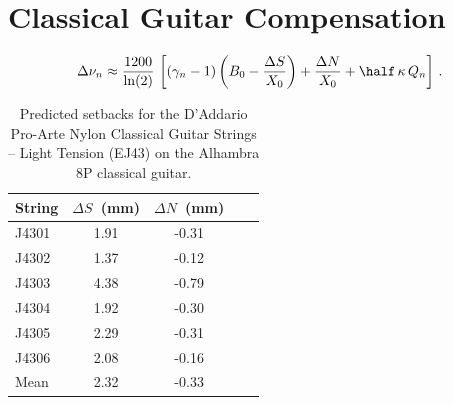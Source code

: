 %
%
%

 \section{Classical Guitar Compensation\label{sct:comp}}

 \begin{equation}\label{eqn:error_comp}
\Delta \nu_n \approx \frac{1200}{\ln(2)}\, \left[ \left(\gamma_n - 1\right) \left(B_0 - \frac{\Delta S}{X_0}\right) + \frac{\Delta N}{X_0} + \half\, \kappa\, Q_n \right]\, .
 \end{equation}



\begin{table}%
  \centering
  \caption{\label{tbl:ej43_setbacks} Predicted setbacks for the D'Addario Pro-Arte Nylon Classical Guitar Strings -- Light Tension (EJ43) on the Alhambra 8P classical guitar.}
    \begin{tabular}{lcccc}
    \hline \hline
    String  & $\Delta S$~(mm) & $\Delta N$~(mm) \\
    \hline
    J4301 & 1.91 & -0.31 \\
    J4302 & 1.37 & -0.12 \\
    J4303 & 4.38 & -0.79 \\
    J4304 & 1.92 & -0.30 \\
    J4305 & 2.29 & -0.31 \\
    J4306 & 2.08 & -0.16 \\
    \hline \hline
    Mean & 2.32 & -0.33 \\
    \hline
    \end{tabular}%
  \label{tab:addlabel}%
\end{table}%


